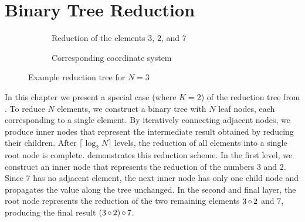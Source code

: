 \chapter{Binary Tree Reduction}
\label{ch:BinaryTreeSummation}

\newcommand{\numLevels}{\lceil \log_2 N \rceil}
\newcommand{\ffs}{\textrm{ffs}}
\newcommand{\nodesum}{\textrm{sum}\,}

\begin{figure}[H]
\centering
\begin{subfigure}{0.45\textwidth}
\centering
{}
\caption{Reduction of the elements $3$, $2$, and $7$}
\label{fig:reductionExample}
\end{subfigure}
\hfill
\begin{subfigure}{0.45\textwidth}
\centering
{}
\caption{Corresponding coordinate system}
\label{fig:coordinateExample}
\end{subfigure}

\caption{Example reduction tree for $N=3$}
\label{fig:reductionAndCoordinateExample}
\end{figure}

In this chapter we present a special case (where $K = 2$) of the reduction tree from .
To reduce $N$ elements, we construct a binary tree with $N$ leaf nodes, each corresponding to a single element.
By iteratively connecting adjacent nodes, we produce inner nodes that represent the intermediate result obtained by reducing their children.
After $\numLevels$ levels, the reduction of all elements into a single root node is complete.
 demonstrates this reduction scheme.
In the first level, we construct an inner node that represents the reduction of the numbers $3$ and $2$.
Since $7$ has no adjacent element, the next inner node has only one child node and propagates the value along the tree unchanged.
In the second and final layer, the root node represents the reduction of the two remaining elements $3 \operatorname{\circ} 2$ and $7$, producing the final result $(3 \operatorname{\circ} 2) \operatorname{\circ} 7$.


